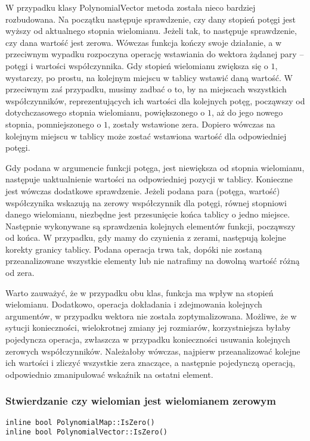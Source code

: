 W przypadku klasy PolynomialVector metoda została nieco bardziej rozbudowana. Na początku następuje sprawdzenie, czy dany stopień potęgi jest wyższy od aktualnego stopnia wielomianu. Jeżeli tak, to następuje sprawdzenie, czy dana wartość jest zerowa. Wówczas funkcja kończy swoje działanie, a w przeciwnym wypadku rozpoczyna operację wstawiania do wektora żądanej pary – potęgi i wartości współczynnika. Gdy stopień wielomianu zwiększa się o $1$, wystarczy, po prostu, na kolejnym miejscu w tablicy wstawić daną wartość. W przeciwnym zaś przypadku, musimy zadbać o to, by na miejscach wszystkich współczynników, reprezentujących ich wartości dla kolejnych potęg, począwszy od dotychczasowego stopnia wielomianu, powiększonego o $1$, aż do jego nowego stopnia, pomniejszonego o $1$, zostały wstawione zera. Dopiero wówczas na kolejnym miejscu w tablicy może zostać wstawiona wartość dla odpowiedniej potęgi.

Gdy podana w argumencie funkcji potęga, jest niewiększa od stopnia wielomianu, następuje uaktualnienie wartości na odpowiedniej pozycji w tablicy. Konieczne jest wówczas dodatkowe sprawdzenie. Jeżeli podana para (potęga, wartość) współczynika wskazują na zerowy współczynnik dla potęgi, równej stopniowi danego wielomianu, niezbędne jest przesunięcie końca tablicy o jedno miejsce. Następnie wykonywane są sprawdzenia kolejnych elementów funkcji, począwszy od końca. W przypadku, gdy mamy do czynienia z zerami, następują kolejne korekty granicy tablicy. Podana operacja trwa tak, dopóki nie zostaną przeanalizowane wszystkie elementy lub nie natrafimy na dowolną wartość różną od zera.

Warto zauważyć, że w przypadku obu klas, funkcja ma wpływ na stopień wielomianu. Dodatkowo, operacja dokładania i zdejmowania kolejnych argumentów, w przypadku wektora nie została zoptymalizowana. Możliwe, że w sytucji konieczności, wielokrotnej zmiany jej rozmiarów, korzystniejsza byłaby pojedyncza operacja, zwłaszcza w przypadku konieczności usuwania kolejnych zerowych współczynników. Należałoby wówczas, najpierw przeanalizować kolejne ich wartości i zliczyć wszystkie zera znaczące, a następnie pojedynczą operacją, odpowiednio zmanipulować wskaźnik na ostatni element.

\subsubsection{Stwierdzanie czy wielomian jest wielomianem zerowym}
\begin{lstlisting}
inline bool PolynomialMap::IsZero()
inline bool PolynomialVector::IsZero()
\end{lstlisting}

